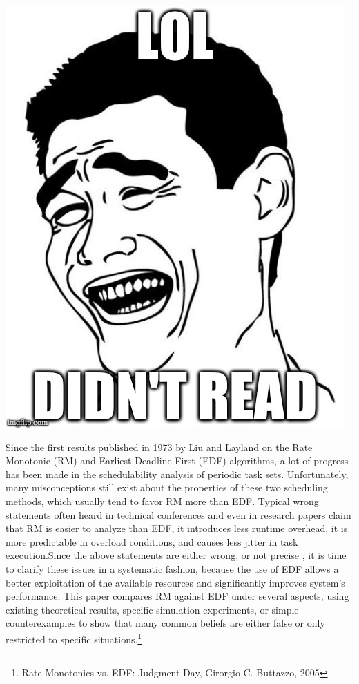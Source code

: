 \begin{frame}{\subsecname}
	\begin{center}
		\includegraphics[scale=0.25]{graphics/memes/aintnobody.jpg}
	\end{center}
\end{frame}

\begin{frame}{\subsecname}
\tiny Since the first results published in 1973 by Liu and Layland on the Rate Monotonic (RM) and Earliest Deadline First (EDF) algorithms, a lot of progress has been made in the schedulability analysis of periodic task sets. Unfortunately, many misconceptions still exist about the properties of these two scheduling methods, which usually tend to favor RM more than EDF. Typical wrong statements often heard in technical conferences and even in research papers claim that RM is easier to analyze than EDF, it introduces less runtime overhead, it is more predictable in overload conditions, and causes less jitter in task execution.Since the above statements are either wrong, or not precise \tiny, it is time to clarify these issues in a systematic fashion, because the use of EDF allows a better exploitation of the available resources and significantly improves system’s performance. This paper compares RM against EDF under several aspects, using existing theoretical results, specific simulation experiments, or simple counterexamples to show that many common beliefs are either false or only restricted to specific situations.\footnote{Rate Monotonics vs. EDF: Judgment Day, Girorgio C. Buttazzo, 2005}
\end{frame}


